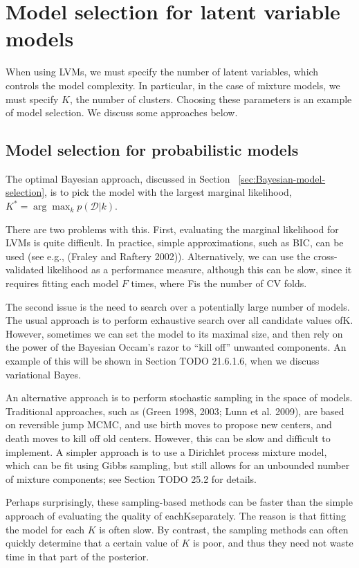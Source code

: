 \section{Model selection for latent variable models}
When using LVMs, we must specify the number of latent variables, which controls the model complexity. In particular, in the case of mixture models, we must specify $K$, the number of clusters. Choosing these parameters is an example of model selection. We discuss some approaches below.


\subsection{Model selection for probabilistic models}
The optimal Bayesian approach, discussed in Section ~\ref{sec:Bayesian-model-selection}, is to pick the model with the largest marginal likelihood, $K^*=\arg\max_k p(\mathcal{D}|k)$.

There are two problems with this. First, evaluating the marginal likelihood for LVMs is quite difficult. In practice, simple approximations, such as BIC, can be used (see e.g., (Fraley and Raftery 2002)). Alternatively, we can use the cross-validated likelihood as a performance measure, although this can be slow, since it requires fitting each model $F$ times, where Fis the number of CV folds.

The second issue is the need to search over a potentially large number of models. The usual approach is to perform exhaustive search over all candidate values ofK. However, sometimes we can set the model to its maximal size, and then rely on the power of the Bayesian Occam’s razor to “kill off” unwanted components. An example of this will be shown in Section TODO 21.6.1.6, when we discuss variational Bayes.

An alternative approach is to perform stochastic sampling in the space of models. Traditional approaches, such as (Green 1998, 2003; Lunn et al. 2009), are based on reversible jump MCMC, and use birth moves to propose new centers, and death moves to kill off old centers. However, this can be slow and difficult to implement. A simpler approach is to use a Dirichlet process mixture model, which can be fit using Gibbs sampling, but still allows for an unbounded number of mixture components; see Section TODO 25.2 for details.

Perhaps surprisingly, these sampling-based methods can be faster than the simple approach of evaluating the quality of eachKseparately. The reason is that fitting the model for each $K$ is often slow. By contrast, the sampling methods can often quickly determine that a certain value of $K$ is poor, and thus they need not waste time in that part of the posterior.


